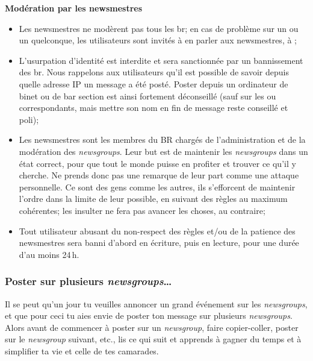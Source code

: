 \textbf{Mod\'eration par les newsmestres}
\begin{itemize}
 \item Les newsmestres ne mod\`erent pas tous les br; en cas de probl\`eme sur un  ou un  quelconque, les utilisateurs sont invit\'es \`a  en parler aux newsmestres, \`a  ;
 \item L'usurpation d'identit\'e est interdite et sera sanctionn\'ee par un bannissement des br. Nous rappelons aux utilisateurs qu'il est possible de savoir depuis quelle adresse IP un message a \'et\'e post\'e. Poster depuis un ordinateur de binet ou de bar section est ainsi fortement d\'econseill\'e (sauf sur les  ou  correspondants, mais mettre son nom en fin de message reste conseill\'e et poli);
 \item Les newsmestres sont les membres du BR charg\'es de l'administration et de la mod\'eration des \emph{newsgroups}. Leur but est de maintenir les \emph{newsgroups} dans un \'etat correct, pour que tout le monde puisse en profiter et trouver ce qu'il y cherche. Ne prends donc pas une remarque de leur part comme une attaque personnelle. Ce sont des gens comme les autres, ils s'efforcent de maintenir l'ordre dans la limite de leur possible, en suivant des r\`egles au maximum coh\'erentes; les insulter ne fera pas avancer les choses, au contraire;
 \item Tout utilisateur abusant du non-respect des r\`egles et/ou de la patience des newsmestres sera banni d'abord en \'ecriture, puis en lecture, pour une dur\'ee d'au moins 24\,h.
\end{itemize}



\subsubsection{Poster sur plusieurs \emph{newsgroups}\dots }



Il se peut qu'un jour tu veuilles annoncer un grand \'ev\'enement sur les \emph{newsgroups}, et que pour ceci tu aies envie de poster ton message sur
plusieurs \emph{newsgroups}. Alors avant de commencer \`a  poster sur un \emph{newsgroup}, faire copier-coller, poster sur le \emph{newsgroup} suivant,
etc., lis ce qui suit et apprends \`a  gagner du temps et \`a  simplifier ta vie et celle de tes camarades.

